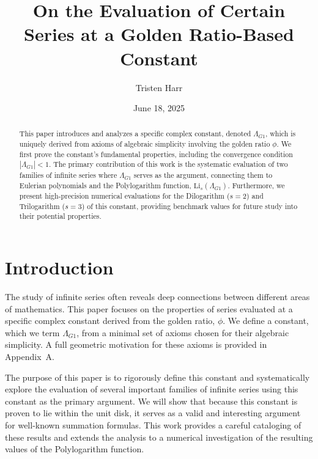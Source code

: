 \documentclass{amsart}
\theoremstyle{plain}
\theoremstyle{definition}
\theoremstyle{remark}
\newcommand{\LambdaG}{\Lambda_{G1}}
\begin{document}
\title[Series Evaluations at a Golden Ratio Constant]{On the Evaluation of Certain Series at a Golden Ratio-Based Constant}
\author{Tristen Harr}
\date{June 18, 2025}

\begin{abstract}
This paper introduces and analyzes a specific complex constant, denoted $\Lambda_{G1}$, which is uniquely derived from axioms of algebraic simplicity involving the golden ratio $\phi$. We first prove the constant's fundamental properties, including the convergence condition $|\LambdaG| < 1$. The primary contribution of this work is the systematic evaluation of two families of infinite series where $\LambdaG$ serves as the argument, connecting them to Eulerian polynomials and the Polylogarithm function, $\mathrm{Li}_s(\LambdaG)$. Furthermore, we present high-precision numerical evaluations for the Dilogarithm ($s=2$) and Trilogarithm ($s=3$) of this constant, providing benchmark values for future study into their potential properties.
\end{abstract}

\maketitle

\section{Introduction}
The study of infinite series often reveals deep connections between different areas of mathematics. This paper focuses on the properties of series evaluated at a specific complex constant derived from the golden ratio, $\phi$. We define a constant, which we term $\LambdaG$, from a minimal set of axioms chosen for their algebraic simplicity. A full geometric motivation for these axioms is provided in Appendix~A.

The purpose of this paper is to rigorously define this constant and systematically explore the evaluation of several important families of infinite series using this constant as the primary argument. We will show that because this constant is proven to lie within the unit disk, it serves as a valid and interesting argument for well-known summation formulas. This work provides a careful cataloging of these results and extends the analysis to a numerical investigation of the resulting values of the Polylogarithm function.

\end{document}
